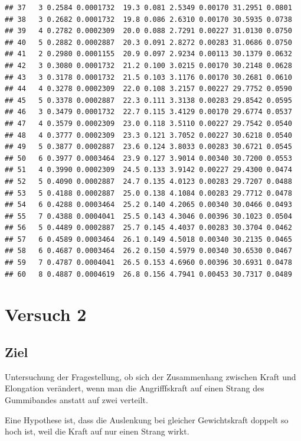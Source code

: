 \documentclass[
]{article}
\begin{document}
\begin{verbatim}
## 37   3 0.2584 0.0001732  19.3 0.081 2.5349 0.00170 31.2951 0.0801
## 38   3 0.2682 0.0001732  19.8 0.086 2.6310 0.00170 30.5935 0.0738
## 39   4 0.2782 0.0002309  20.0 0.088 2.7291 0.00227 31.0130 0.0750
## 40   5 0.2882 0.0002887  20.3 0.091 2.8272 0.00283 31.0686 0.0750
## 41   2 0.2980 0.0001155  20.9 0.097 2.9234 0.00113 30.1379 0.0632
## 42   3 0.3080 0.0001732  21.2 0.100 3.0215 0.00170 30.2148 0.0628
## 43   3 0.3178 0.0001732  21.5 0.103 3.1176 0.00170 30.2681 0.0610
## 44   4 0.3278 0.0002309  22.0 0.108 3.2157 0.00227 29.7752 0.0590
## 45   5 0.3378 0.0002887  22.3 0.111 3.3138 0.00283 29.8542 0.0595
## 46   3 0.3479 0.0001732  22.7 0.115 3.4129 0.00170 29.6774 0.0537
## 47   4 0.3579 0.0002309  23.0 0.118 3.5110 0.00227 29.7542 0.0540
## 48   4 0.3777 0.0002309  23.3 0.121 3.7052 0.00227 30.6218 0.0540
## 49   5 0.3877 0.0002887  23.6 0.124 3.8033 0.00283 30.6721 0.0545
## 50   6 0.3977 0.0003464  23.9 0.127 3.9014 0.00340 30.7200 0.0553
## 51   4 0.3990 0.0002309  24.5 0.133 3.9142 0.00227 29.4300 0.0474
## 52   5 0.4090 0.0002887  24.7 0.135 4.0123 0.00283 29.7207 0.0488
## 53   5 0.4188 0.0002887  25.0 0.138 4.1084 0.00283 29.7712 0.0478
## 54   6 0.4288 0.0003464  25.2 0.140 4.2065 0.00340 30.0466 0.0493
## 55   7 0.4388 0.0004041  25.5 0.143 4.3046 0.00396 30.1023 0.0504
## 56   5 0.4489 0.0002887  25.7 0.145 4.4037 0.00283 30.3704 0.0462
## 57   6 0.4589 0.0003464  26.1 0.149 4.5018 0.00340 30.2135 0.0465
## 58   6 0.4687 0.0003464  26.2 0.150 4.5979 0.00340 30.6530 0.0467
## 59   7 0.4787 0.0004041  26.5 0.153 4.6960 0.00396 30.6931 0.0478
## 60   8 0.4887 0.0004619  26.8 0.156 4.7941 0.00453 30.7317 0.0489
\end{verbatim}

\hypertarget{versuch-2}{%
\section{Versuch 2}\label{versuch-2}}

\hypertarget{ziel-1}{%
\subsection{Ziel}\label{ziel-1}}

Untersuchung der Fragestellung, ob sich der Zusammenhang zwischen Kraft
und Elongation verändert, wenn man die Angrifffskraft auf einen Strang
des Gummibandes anstatt auf zwei verteilt.

Eine Hypothese ist, dass die Auslenkung bei gleicher Gewichtskraft
doppelt so hoch ist, weil die Kraft auf nur einen Strang wirkt.
\end{document}

